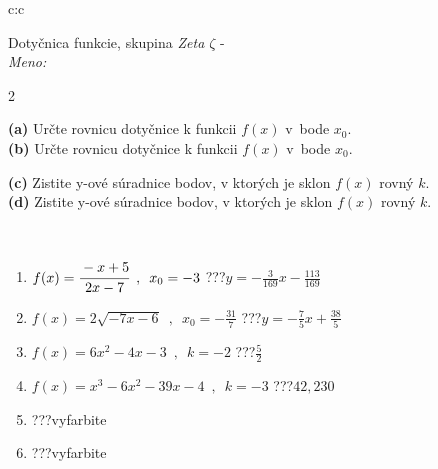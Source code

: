 \documentclass[10pt]{report}
\begin{document}
\begin{tabular}{c:c}
\begin{minipage}[c][104.5mm][t]{0.5\linewidth}
\begin{center}
\vspace{7mm}
{\huge Dotyčnica funkcie, skupina \textit{Zeta $\zeta$} -}\\[5mm]
\textit{Meno:}\phantom{xxxxxxxxxxxxxxxxxxxxxxxxxxxxxxxxxxxxxxxxxxxxxxxxxxxxxxxxxxxxxxxxx}\\[5mm]
\begin{minipage}{0.95\linewidth}
\begin{center}
{\small \begin{multicols}{2} \raggedright
\textbf{(a)} Určte rovnicu dotyčnice k funkcii \(f(x)\) v~bode \(x_0\). \\[1mm]
\textbf{(b)} Určte rovnicu dotyčnice k funkcii \(f(x)\) v~bode \(x_0\). \par \columnbreak
\textbf{(c)} Zistite y-ové súradnice bodov, v ktorých je sklon \(f(x)\) rovný \(k\). \\[1mm]
\textbf{(d)} Zistite y-ové súradnice bodov, v ktorých je sklon \(f(x)\) rovný \(k\). \\[1mm]
\end{multicols}
}
\end{center}
\end{minipage}
\\[4mm]
\begin{minipage}{0.79\linewidth}
\begin{center}
\begin{varwidth}{\linewidth}
\begin{enumerate}
\normalsizerr
\item $f(x)=\cfrac{-x+5}{2x-7}\enspace , \enspace x_0=-3$\quad \dotfill\; ???\;\dotfill \quad $y = -\frac{3}{169}x-\frac{113}{169}$
\item $f(x)=2\sqrt{-7x-6}\enspace , \enspace x_0=-\frac{31}{7}$\quad \dotfill\; ???\;\dotfill \quad $y = -\frac{7}{5}x+\frac{38}{5}$
\item $f(x)=6x^2-4x-3\enspace , \enspace k=-2$\quad \dotfill\; ???\;\dotfill \quad $\frac{5}{2}$
\item $f(x)=x^3-6x^2-39x-4\enspace , \enspace k=-3$\quad \dotfill\; ???\;\dotfill \quad $42 , 230$
\item \quad \dotfill\; ???\;\dotfill \quad vyfarbite
\item \quad \dotfill\; ???\;\dotfill \quad vyfarbite
\end{enumerate}
\end{varwidth}

\end{center}
\end{minipage}
\end{center}
\end{minipage}
\end{tabular}
\end{document}
